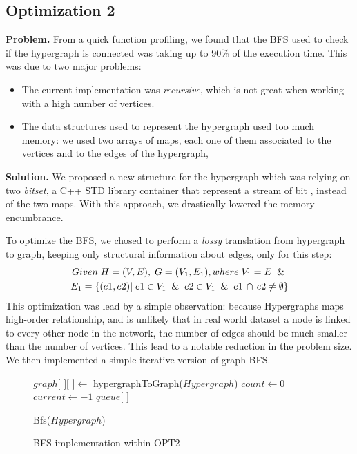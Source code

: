 \documentclass[conference]{IEEEtran}
\newcommand{\mypar}[1]{{\bf #1.}}
\begin{document}
\subsection{Optimization 2}
\mypar{Problem}
From a quick function profiling, we found that the BFS used to check if the hypergraph is connected was taking up to 90\% of the execution time. This was due to two major problems:
\begin{itemize}
    \item The current implementation was \textit{recursive}, which is not great when working with a high number of vertices.
    \item The data structures used to represent the hypergraph used too much memory: we used two arrays of maps, each one of them associated to the vertices and to the edges of the hypergraph, 
\end{itemize}
\mypar{Solution}
We proposed a new structure for the hypergraph which was relying on two \textit{bitset}, a C++ STD library container that represent a stream of bit \cite{bitset}, instead of the two maps. With this approach, we drastically lowered the memory encumbrance.

To optimize the BFS, we chosed to perform a \textit{lossy} translation from hypergraph to graph, keeping only structural information about edges, only for this step: 
\begin{multline*}
    Given\;H=(V,E),\; G=(V_1,E_1), where\;V_1=E\And\\
    E_1=\{(e1,e2) |\; e1\in V_1 \And e2\in V_1 \And e1\,\cap\,e2\neq\emptyset\}
\end{multline*}
This optimization was lead by a simple observation: because Hypergraphs maps high-order relationship, and is unlikely that in real world dataset a node is linked to every other node in the network, the number of edges should be much smaller than the number of vertices. This lead to a notable reduction in the problem size. We then implemented a simple iterative version of graph BFS.

\begin{figure}[H]
    \begin{algorithm}[H]
    \SetAlgoLined
        $graph[$ $][$ $] \gets $ hypergraphToGraph($Hypergraph$)\;
        $count \gets 0$\;
        $current \gets -1$\;
        $queue[$ $]$\;
    \caption{Bfs($Hypergraph$)}
    \end{algorithm}
    \caption{BFS implementation within OPT2}
\end{figure}
\end{document}
